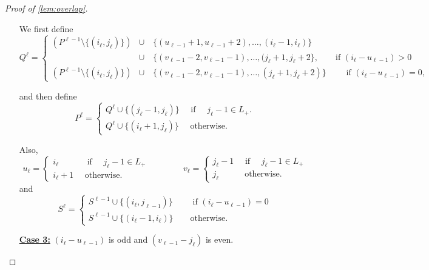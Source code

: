 \documentclass[10pt,a4paper]{article}
\theoremstyle{definition}%
\theoremstyle{plain}
\begin{document}
\begin{proof}[Proof of \autoref{lem:overlap}]
\begin{enumerate}
        We first define
        \[
            Q^\ell = \begin{cases}
                (P^{\ell-1} \setminus \{(i_\ell, j_\ell)\}) & \cup \quad \{(u_{\ell-1}+1, u_{\ell-1}+2), \ldots, (i_\ell -1, i_\ell)\} \\
                & \cup \quad \{(v_{\ell-1}-2, v_{\ell-1}-1), \ldots, (j_\ell +1, j_\ell +2\}, 
                \qquad \text{if } (i_\ell - u_{\ell-1}) > 0\\
                (P^{\ell-1} \setminus \{(i_\ell, j_\ell)\}) &\cup \quad \{(v_{\ell-1}-2, v_{\ell-1}-1), \ldots, (j_\ell +1, j_\ell +2)\} 
                \qquad \text{ if } (i_\ell - u_{\ell-1}) = 0,
            \end{cases}
        \]
        
        and then define
        \[
            P^\ell = \begin{cases}
                Q^\ell \cup \{(j_\ell -1, j_\ell)\} \quad \text{ if } \quad j_\ell -1 \in L_+.\\
                Q^\ell \cup \{(i_\ell +1, j_\ell)\} \quad \text{ otherwise.} 
                \end{cases} 
        \]
        
        Also,
        \[
            u_\ell = \begin{cases}
                i_\ell \qquad \quad \text{ if } \quad j_\ell -1 \in L_+\\
                i_\ell +1 \quad \text{ otherwise.} 
            \end{cases} 
            \qquad \qquad 
            v_\ell = \begin{cases}
                j_\ell - 1 \quad \text{ if } \quad j_\ell -1 \in L_+\\
                j_\ell \qquad \quad \text{otherwise.} 
            \end{cases} 
        \]
        and
        \[
            S^\ell = \begin{cases}
                S^{\ell -1} \cup \{(i_\ell, j_{\ell -1})\} \qquad \text{ if } (i_\ell - u_{\ell-1}) = 0  \\
                S^{\ell -1} \cup \{(i_\ell -1, i_\ell)\} \qquad \text{otherwise.}
            \end{cases}
        \]
        \item[\underline{\textbf{Case 3:}}] $(i_\ell - u_{\ell-1})$ is odd and $(v_{\ell-1} - j_\ell)$ is even.


\end{enumerate}
\end{proof}
\end{document}
